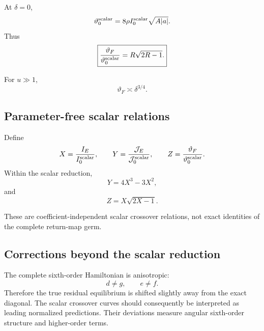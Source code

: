 At \(\delta=0\),
\[
\vartheta_0^{\rm scalar}
=
8\rho I_0^{\rm scalar}\sqrt{A|a|}.
\]
Thus
\[
\boxed{
\frac{\vartheta_F}{\vartheta_0^{\rm scalar}}
=
R\sqrt{2R-1}.
}
\]

For \(u\gg1\),
\[
\vartheta_F\asymp\delta^{3/4}.
\]

\subsection{Parameter-free scalar relations}

Define
\[
X=\frac{I_E}{I_0^{\rm scalar}},
\qquad
Y=\frac{\mathcal{J}_E}{\mathcal{J}_0^{\rm scalar}},
\qquad
Z=\frac{\vartheta_F}{\vartheta_0^{\rm scalar}}.
\]
Within the scalar reduction,
\begin{equation}
\boxed{
Y=4X^3-3X^2,
}
\label{eq:YX}
\end{equation}
and
\begin{equation}
\boxed{
Z=X\sqrt{2X-1}.
}
\label{eq:ZX}
\end{equation}

These are coefficient-independent scalar crossover relations, not exact identities of the complete return-map germ.

\subsection{Corrections beyond the scalar reduction}

The complete sixth-order Hamiltonian is anisotropic:
\[
d\neq g,\qquad e\neq f.
\]
Therefore the true residual equilibrium is shifted slightly away from the exact diagonal. The scalar crossover curves should consequently be interpreted as leading normalized predictions. Their deviations measure angular sixth-order structure and higher-order terms.
